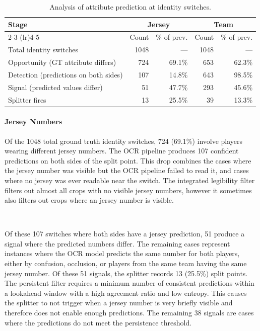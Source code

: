 \begin{table}[H]
\centering
\begin{tabular}{lrrrr}
\toprule
\textbf{Stage} & \multicolumn{2}{c}{\textbf{Jersey}} & \multicolumn{2}{c}{\textbf{Team}} \\
\cmidrule(lr){2-3} \cmidrule(lr){4-5}
 & Count & \% of prev. & Count & \% of prev. \\
\midrule
Total identity switches & 1048 & --- & 1048 & --- \\
Opportunity (GT attribute differs) & 724 & 69.1\% & 653 & 62.3\% \\
Detection (predictions on both sides) & 107 & 14.8\% & 643 & 98.5\% \\
Signal (predicted values differ) & 51 & 47.7\% & 293 & 45.6\% \\
Splitter fires & 13 & 25.5\% & 39 & 13.3\% \\
\bottomrule
\end{tabular}
\caption{Analysis of attribute prediction at identity switches.}
\label{tab:attribute_analysis}
\end{table}


\paragraph{Jersey Numbers}
Of the 1048 total ground truth identity switches, 724 (69.1\%) involve players wearing different jersey numbers. The OCR pipeline produces 107 confident predictions on both sides of the split point. This drop combines the cases where the jersey number was visible but the OCR pipeline failed to read it, and cases where no jersey was ever readable near the switch. The integrated legibility filter filters out almost all crops with no visible jersey numbers, however it sometimes also filters out crops where an jersey number is visible. 

\

Of these 107 switches where both sides have a jersey prediction, 51 produce a signal where the predicted numbers differ. The remaining cases represent instances where the OCR model predicts the same number for both players, either by confusion, occlusion, or players from the same team having the same jersey number. Of these 51 signals, the splitter records 13 (25.5\%) split points. The persistent filter requires a minimum number of  consistent  predictions within a lookahead window with a high agreement ratio and low entropy. This causes the splitter to not trigger when a jersey number is very briefly visible and therefore does not enable enough predictions. The remaining 38 signals are cases where the predictions do not meet the persistence threshold.

